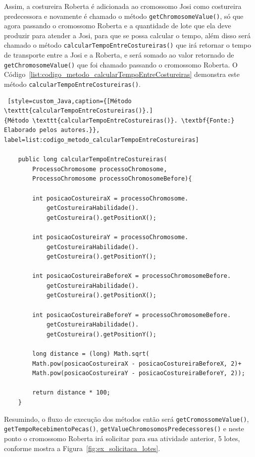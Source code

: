 \par Assim, a costureira Roberta é adicionada ao cromossomo Josi como costureira predecessora e novamente é chamado o método \texttt{getChromosomeValue()}, só que agora passando o cromossomo Roberta e a quantidade de lote que ela deve produzir para 
atender a Josi, para que se possa calcular o tempo, além disso será chamado o método \texttt{calcularTempoEntreCostureiras()} que irá 
retornar o tempo de transporte entre a Josi e a Roberta, e será somado ao valor retornado de \texttt{getChromosomeValue()} que  
foi chamado passando o cromossomo Roberta. O Código~\ref{list:codigo_metodo_calcularTempoEntreCostureiras} demonstra este método \texttt{calcularTempoEntreCostureiras()}.



\begin{lstlisting} [style=custom_Java,caption={[Método \texttt{calcularTempoEntreCostureiras()}.]
{Método \texttt{calcularTempoEntreCostureiras()}. \textbf{Fonte:} Elaborado pelos autores.}}, label=list:codigo_metodo_calcularTempoEntreCostureiras] 	

	public long calcularTempoEntreCostureiras(
		ProcessoChromosome processoChromosome,
		ProcessoChromosome processoChromosomeBefore){
		
		int posicaoCostureiraX = processoChromosome.
			getCostureiraHabilidade().
			getCostureira().getPositionX();
			
		int posicaoCostureiraY = processoChromosome.
			getCostureiraHabilidade().
			getCostureira().getPositionY();
		
		int posicaoCostureiraBeforeX = processoChromosomeBefore.
			getCostureiraHabilidade().
			getCostureira().getPositionX();
			
		int posicaoCostureiraBeforeY = processoChromosomeBefore.
			getCostureiraHabilidade().
			getCostureira().getPositionY();
		
		long distance = (long) Math.sqrt(
		Math.pow(posicaoCostureiraX - posicaoCostureiraBeforeX, 2)+
		Math.pow(posicaoCostureiraY - posicaoCostureiraBeforeY, 2));
		
		return distance * 100;
	}

\end{lstlisting}

\par Resumindo, o fluxo de execução dos métodos então será \texttt{getCromossomeValue()}, \texttt{getTempoRecebimentoPecas()}, \texttt{getValueChromosomosPredecessores()} e neste ponto o cromossomo Roberta irá solicitar 
para sua atividade anterior, 5 lotes, conforme mostra a Figura~\ref{fig:ex_solicitaca_lotes}.

